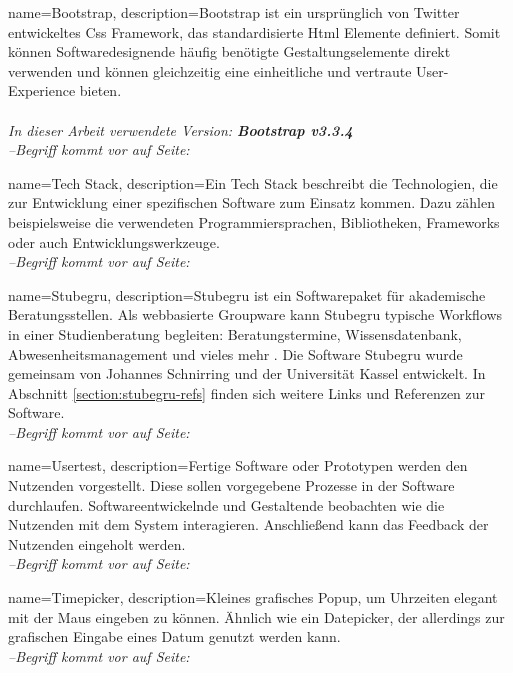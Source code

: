 \makeglossaries

{
    name=Bootstrap,
    description={Bootstrap ist ein ursprünglich von Twitter entwickeltes \gls{Css} Framework, das standardisierte \gls{Html} Elemente definiert. Somit können Softwaredesignende häufig benötigte Gestaltungselemente direkt verwenden und können gleichzeitig eine einheitliche und vertraute User-Experience bieten.\\ \\
            \textit{In dieser Arbeit verwendete Version: \textbf{Bootstrap v3.3.4}}
             \cite{Bootstrap}}
    \\\textit{--Begriff kommt vor auf Seite: }
}

{
    name=Tech Stack,
    description={Ein Tech Stack beschreibt die Technologien, die zur Entwicklung einer spezifischen Software zum Einsatz kommen. Dazu zählen beispielsweise die verwendeten Programmiersprachen, Bibliotheken, Frameworks oder auch Entwicklungswerkzeuge.}
    \\\textit{--Begriff kommt vor auf Seite: }
}

{
    name=Stubegru,
    description={Stubegru ist ein Softwarepaket für akademische Beratungsstellen. Als webbasierte Groupware kann Stubegru typische Workflows in einer Studienberatung begleiten: Beratungstermine, Wissensdatenbank, Abwesenheitsmanagement und vieles mehr
             \cite{stubegruWebsite}. Die Software Stubegru wurde gemeinsam von Johannes Schnirring und der Universität Kassel entwickelt. In Abschnitt \ref{section:stubegru-refs} finden sich weitere Links und Referenzen zur Software.}
    \\\textit{--Begriff kommt vor auf Seite: }
}

{
    name=Usertest,
    description={Fertige Software oder Prototypen werden den Nutzenden vorgestellt. Diese sollen vorgegebene Prozesse in der Software durchlaufen. Softwareentwickelnde und Gestaltende beobachten wie die Nutzenden mit dem System interagieren. Anschließend kann das Feedback der Nutzenden eingeholt werden.}
    \\\textit{--Begriff kommt vor auf Seite: }
}

{
    name=Timepicker,
    description={Kleines grafisches Popup, um Uhrzeiten elegant mit der Maus eingeben zu können. Ähnlich wie ein Datepicker, der allerdings zur grafischen Eingabe eines Datum genutzt werden kann.
             \cite{datepicker}}
    \\\textit{--Begriff kommt vor auf Seite: }
}


